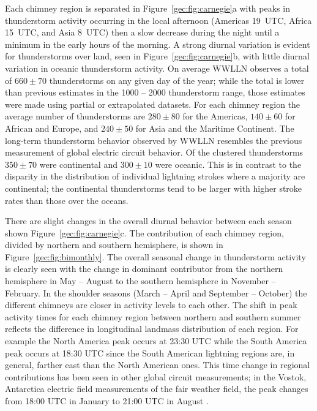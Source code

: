 Each chimney region is separated in Figure~\ref{gec:fig:carnegie}a with peaks in thunderstorm activity occurring in the local afternoon (Americas 19~UTC, Africa 15~UTC, and Asia 8~UTC) then a slow decrease during the night until a minimum in the early hours of the morning.
A strong diurnal variation is evident for thunderstorms over land, seen in Figure~\ref{gec:fig:carnegie}b, with  little diurnal variation in oceanic thunderstorm activity.
On average WWLLN observes a total of $660 \pm 70$ thunderstorms on any given day of the year; while the total is lower than previous estimates in the 1000 -- 2000 thunderstorm range, those estimates were made using partial or extrapolated datasets.
For each chimney region the average number of thunderstorms are $280 \pm 80$ for the Americas, $140 \pm 60$ for African and Europe, and $240 \pm 50$ for Asia and the Maritime Continent.
The long-term thunderstorm behavior observed by WWLLN resembles the previous measurement of global electric circuit behavior.
Of the clustered thunderstorms $350 \pm 70$ were continental and $300 \pm 10$ were oceanic.
This is in contrast to the disparity in the distribution of individual lightning strokes where a majority are continental; the continental thunderstorms tend to be larger with higher stroke rates than those over the oceans.

There are slight changes in the overall diurnal behavior between each season shown Figure~\ref{gec:fig:carnegie}c.
The contribution of each chimney region, divided by northern and southern hemisphere, is shown in Figure~\ref{gec:fig:bimonthly}.
The overall seasonal change in thunderstorm activity is clearly seen with the change in dominant contributor from the northern hemisphere in May -- August to the southern hemisphere in November -- February.
In the shoulder seasons (March -- April and September -- October) the different chimneys are closer in activity levels to each other.
The shift in peak activity times for each chimney region between northern and southern summer reflects the difference in longitudinal landmass distribution of each region.
For example the North America peak occurs at 23:30 UTC while the South America peak occurs at 18:30 UTC since the South American lightning regions are, in general, farther east than the North American ones.
This time change in regional contributions has been seen in other global circuit measurements; in the Vostok, Antarctica electric field measurements of the fair weather field, the peak changes from 18:00 UTC in January to 21:00 UTC in August \citep{Burns2005, Burns2012}.

